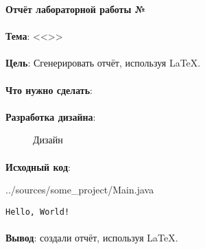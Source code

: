 \documentclass[12pt, a4paper, simple]{eskdtext}
\def \gpiDocTopic {Отчёт лабораторной работы №\gpiDocNum}
\begin{document}



\begin{center}
    \textbf{\gpiDocTopic}
\end{center}

\paragraph{} \textbf{Тема}: <<\gpiTopicRep>>

\paragraph{} \textbf{Цель}: Сгенерировать отчёт, используя \LaTeX.

\paragraph{} \textbf{Что нужно сделать}:

\paragraph{} \textbf{Разработка дизайна}:

\begin{figure}[!h]
    \centering
    \caption{Дизайн}
\end{figure}

\paragraph{} \textbf{Исходный код}: 


{../sources/some_project/Main.java}


\begin{lstlisting}[name=Вывод в консоль]
Hello, World!
\end{lstlisting}


\paragraph{} \textbf{Вывод}:
создали отчёт, используя \LaTeX.


\newpage
\end{document}
